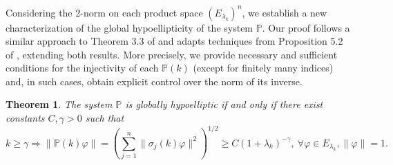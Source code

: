 \documentclass{amsart}
\newtheorem{theorem}{Theorem}[section]
\theoremstyle{definition}
\theoremstyle{remark}
\numberwithin{equation}{section}
\begin{document}
	
	Considering the 2-norm on each product space $(E_{\lambda_k})^n$, we establish a new characterization of the global hypoellipticity of the system $\mathbb{P}$. Our proof follows a similar approach to Theorem 3.3 of \cite{KM2020} and adapts techniques from Proposition 5.2 of \cite{AFR2024}, extending both results. More precisely, we provide necessary and sufficient conditions for the injectivity of each $\mathbb{P}(k)$ (except for finitely many indices) and, in such cases, obtain explicit control over the norm of its inverse.
	
	\begin{theorem}\label{gh_est}
		The system $\mathbb{P}$ is globally hypoelliptic if and only if there exist constants $C,\gamma>0$ such that
		\begin{equation}\label{GH-system-condition}
			k\geq\gamma \Rightarrow \|\mathbb{P}(k)\varphi\| = \left( \sum_{j=1}^n \|\sigma_j(k)\varphi\|^2 \right)^{1/2} \!\!\! \geq C(1+\lambda_k)^{-\gamma},\  \forall \varphi\in E_{\lambda_k}, \|\varphi\|=1.
		\end{equation}
	\end{theorem}
	
\end{document}
